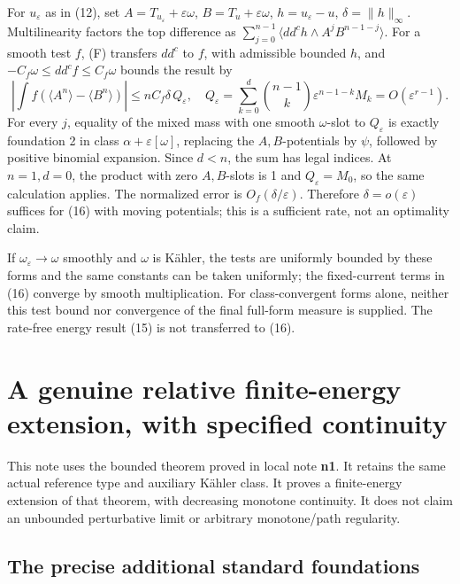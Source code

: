 \documentclass[
  11pt,
]{article}
\begin{document}
For \(u_\varepsilon\) as in (12), set
\(A=T_{u_\varepsilon}+\varepsilon\omega\), \(B=T_u+\varepsilon\omega\),
\(h=u_\varepsilon-u\), \(\delta=\|h\|_\infty\). Multilinearity factors
the top difference as
\(\sum_{j=0}^{n-1}\langle dd^ch\wedge A^jB^{n-1-j}\rangle\). For a
smooth test \(f\), (F) transfers \(dd^c\) to \(f\), with admissible
bounded \(h\), and \(-C_f\omega\leq dd^cf\leq C_f\omega\) bounds the
result by \[
\left|\int f(\langle A^n\rangle-\langle B^n\rangle)\right|
\leq nC_f\delta\,Q_\varepsilon,
\quad
Q_\varepsilon=\sum_{k=0}^d\binom{n-1}k\varepsilon^{n-1-k}M_k
=O(\varepsilon^{r-1}).
\tag{17}
\] For every \(j\), equality of the mixed mass with one smooth
\(\omega\)-slot to \(Q_\varepsilon\) is exactly foundation 2 in class
\(\alpha+\varepsilon[\omega]\), replacing the \(A,B\)-potentials by
\(\psi\), followed by positive binomial expansion. Since \(d<n\), the
sum has legal indices. At \(n=1,d=0\), the product with zero
\(A,B\)-slots is 1 and \(Q_\varepsilon=M_0\), so the same calculation
applies. The normalized error is \(O_f(\delta/\varepsilon)\). Therefore
\(\delta=o(\varepsilon)\) suffices for (16) with moving potentials; this
is a sufficient rate, not an optimality claim.

If \(\omega_\varepsilon\to\omega\) smoothly and \(\omega\) is Kähler,
the tests are uniformly bounded by these forms and the same constants
can be taken uniformly; the fixed-current terms in (16) converge by
smooth multiplication. For class-convergent forms alone, neither this
test bound nor convergence of the final full-form measure is supplied.
The rate-free energy result (15) is not transferred to (16).

\section{A genuine relative finite-energy extension, with specified
continuity}\label{a-genuine-relative-finite-energy-extension-with-specified-continuity}

This note uses the bounded theorem proved in local note \textbf{n1}. It
retains the same actual reference type and auxiliary Kähler class. It
proves a finite-energy extension of that theorem, with decreasing
monotone continuity. It does not claim an unbounded perturbative limit
or arbitrary monotone/path regularity.

\subsection{The precise additional standard
foundations}\label{the-precise-additional-standard-foundations}
\end{document}
